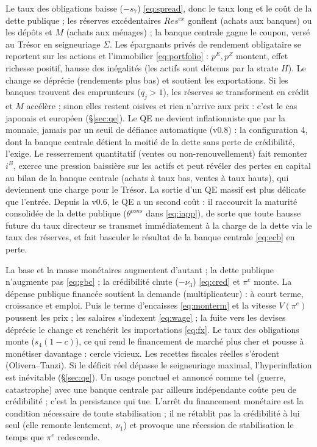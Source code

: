 \documentclass[11pt,a4paper]{article}
\begin{document}
\direct Le taux des obligations baisse ($-s_7$) \eqref{eq:spread}, donc le taux long et le coût de la dette publique ; les réserves excédentaires $Res^{ex}$ gonflent (achats aux banques) ou les dépôts et $M$ (achats aux ménages) ; la banque centrale gagne le coupon, versé au Trésor en seigneuriage $\Sigma$.
\second Les épargnants privés de rendement obligataire se reportent sur les actions et l'immobilier \eqref{eq:portfolio} : $p^E, p^Z$ montent, effet richesse positif, hausse des inégalités (les actifs sont détenus par la strate $H$). Le change se déprécie (rendements plus bas) et soutient les exportations. Si les banques trouvent des emprunteurs ($q_j>1$), les réserves se transforment en crédit et $M$ accélère ; sinon elles restent oisives et rien n'arrive aux prix : c'est le cas japonais et européen (\S\ref{sec:qe}). Le QE ne devient inflationniste que par la monnaie, jamais par un seuil de défiance automatique (v0.8) : la configuration 4, dont la banque centrale détient la moitié de la dette sans perte de crédibilité, l'exige.
\baisse Le resserrement quantitatif (ventes ou non-renouvellement) fait remonter $i^B$, exerce une pression baissière sur les actifs et peut révéler des pertes en capital au bilan de la banque centrale (achats à taux bas, ventes à taux hauts), qui deviennent une charge pour le Trésor. La sortie d'un QE massif est plus délicate que l'entrée. Depuis la v0.6, le QE a un second coût : il raccourcit la maturité consolidée de la dette publique ($\theta^{cons}$ dans \eqref{eq:iapp}), de sorte que toute hausse future du taux directeur se transmet immédiatement à la charge de la dette via le taux des réserves, et fait basculer le résultat de la banque centrale \eqref{eq:ecb} en perte.

\direct La base et la masse monétaires augmentent d'autant ; la dette publique n'augmente pas \eqref{eq:gbc} ; la crédibilité chute ($-\nu_3$) \eqref{eq:cred} et $\pi^e$ monte.
\second La dépense publique financée soutient la demande (multiplicateur) : à court terme, croissance et emploi. Puis le terme d'encaisses \eqref{eq:monterm} et la vitesse $V(\pi^e)$ poussent les prix ; les salaires s'indexent \eqref{eq:wage} ; la fuite vers les devises déprécie le change et renchérit les importations \eqref{eq:fx}. Le taux des obligations monte ($s_4(1-c)$), ce qui rend le financement de marché plus cher et pousse à monétiser davantage : cercle vicieux. Les recettes fiscales réelles s'érodent (Olivera--Tanzi). Si le déficit réel dépasse le seigneuriage maximal, l'hyperinflation est inévitable (\S\ref{sec:qe}). Un usage ponctuel et annoncé comme tel (guerre, catastrophe) avec une banque centrale par ailleurs indépendante coûte peu de crédibilité ; c'est la persistance qui tue.
\baisse L'arrêt du financement monétaire est la condition nécessaire de toute stabilisation ; il ne rétablit pas la crédibilité à lui seul (elle remonte lentement, $\nu_1$) et provoque une récession de stabilisation le temps que $\pi^e$ redescende.
\end{document}
